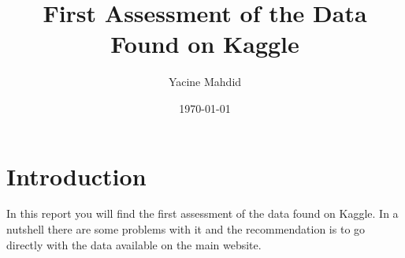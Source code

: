 \documentclass[a4paper,12pt]{article}
\begin{document}
\title{First Assessment of the Data Found on Kaggle}
\author{Yacine Mahdid}
\date{\today}
\maketitle

\tableofcontents
\newpage
{}

\section{Introduction}
In this report you will find the first assessment of the data found on Kaggle. In a nutshell there are some problems with it and the recommendation is to go directly with the data available on the main website.
\end{document}
